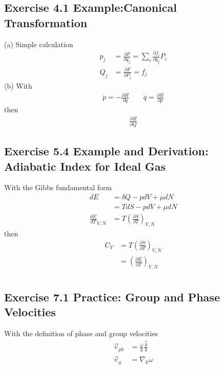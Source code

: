 \documentclass[../main.tex]{subfiles}
\begin{document}
\subsection{Exercise 4.1 Example:Canonical Transformation}
(a) Simple calculation
\begin{align}
p_j&=\frac{\partial F}{\partial q_j}=\sum_i\frac{\partial f_i}{\partial q_j}P_i\\
Q_j&=\frac{\partial F}{\partial P_j}=f_j
\end{align}
(b) With
\begin{align}
\dot{p}=-\frac{\partial H}{\partial q}\qquad
\dot{q}=\frac{\partial H}{\partial p}
\end{align}
then
\begin{align}
\frac{\partial H}{\partial Q}
\end{align}

\subsection{Exercise 5.4 Example and Derivation: Adiabatic Index for Ideal Gas}
With the Gibbs fundamental form 
\begin{align}
dE&=\delta Q-pdV+\mu dN\\
&=TdS-pdV+\mu dN\\
\frac{dE}{dT}_{V,N}&=T\left(\frac{\partial S}{\partial T}\right)_{V,N}
\end{align}
then
\begin{align}
C_V&=T\left(\frac{\partial S}{\partial T}\right)_{V,N}\\
&=\left(\frac{\partial E}{\partial T}\right)_{V,N}\\
\end{align}

\subsection{Exercise 7.1 Practice: Group and Phase Velocities}
With the definition of phase and group velocities
\begin{align}
    \vec{v}_{ph}&=\frac{\omega}{k}\frac{\vec{k}}{k}\\
    \vec{v}_{g}&=\nabla_k{\omega}
\end{align}
\end{document}
